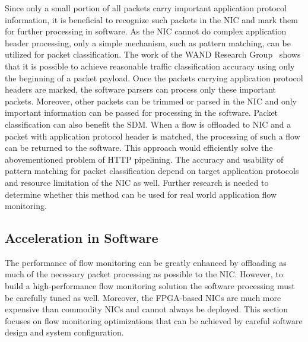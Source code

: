 Since only a small portion of all packets carry important application protocol information, it is beneficial to recognize such packets in the NIC and mark them for further processing in software. As the NIC cannot do complex application header processing, only a simple mechanism, such as pattern matching, can be utilized for packet classification. The work of the WAND Research Group~\cite{Alcock-2012-libprotoident} shows that it is possible to achieve reasonable traffic classification accuracy using only the beginning of a packet payload. Once the packets carrying application protocol headers are marked, the software parsers can process only these important packets. Moreover, other packets can be trimmed or parsed in the NIC and only important information can be passed for processing in the software. Packet classification can also benefit the SDM. When a flow is offloaded to NIC and a packet with application protocol header is matched, the processing of such a flow can be returned to the software. This approach would efficiently solve the abovementioned problem of HTTP pipelining. The accuracy and usability of pattern matching for packet classification depend on target application protocols and resource limitation of the NIC as well. Further research is needed to determine whether this method can be used for real world application flow monitoring.


\subsection{Acceleration in Software}

The performance of flow monitoring can be greatly enhanced by offloading as much of the necessary packet processing as possible to the NIC. However, to build a high-performance flow monitoring solution the software processing must be carefully tuned as well. Moreover, the FPGA-based NICs are much more expensive than commodity NICs and cannot always be deployed. This section focuses on flow monitoring optimizations that can be achieved by careful software design and system configuration.

